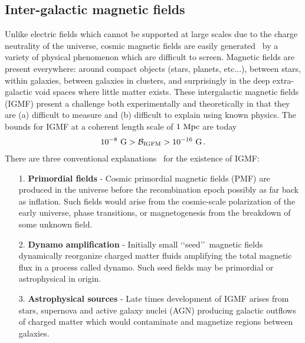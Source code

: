 \documentclass[a4paper]{article}
\begin{document}
\subsection{Inter-galactic magnetic fields}\label{sec:IGMF}
\noindent Unlike electric fields which cannot be supported at large scales due to the charge neutrality of the universe, cosmic magnetic fields are easily generated~\cite{kronberg1994extragalactic,gaensler2004origin,durrer2013cosmological} by a variety of physical phenomenon which are difficult to screen. Magnetic fields are present everywhere: around compact objects (stars, planets, etc...), between stars, within galaxies, between galaxies in clusters, and surprisingly in the deep extra-galactic void spaces where little matter exists. These intergalactic magnetic fields (IGMF) present a challenge both experimentally and theoretically in that they are (a) difficult to measure and (b) difficult to explain using known physics. The bounds for IGMF at a coherent length scale of $1{\rm\ Mpc}$ are today~\cite{neronov2010evidence,taylor2011extragalactic,pshirkov2015new,vernstrom2021discovery}
\begin{align}
    10^{-8}{\rm\ G}>\mathcal{B}_{\rm IGFM}>10^{-16}{\rm\ G}\,.
\end{align}
There are three conventional explanations~\cite{batista2021gammaray} for the existence of IGMF:
\begin{itemize}
    \item [1.] \textbf{Primordial fields} - Cosmic primordial magnetic fields (PMF) are produced in the universe before the recombination epoch possibly as far back as inflation. Such fields would arise from the cosmic-scale polarization of the early universe, phase transitions, or magnetogenesis from the breakdown of some unknown field.
    \item [2.] \textbf{Dynamo amplification} - Initially small \lq\lq seed\rq\rq\ magnetic fields dynamically reorganize charged matter fluids amplifying the total magnetic flux in a process called dynamo. Such seed fields may be primordial or astrophysical in origin.
    \item [3.] \textbf{Astrophysical sources} - Late times development of IGMF arises from stars, supernova and active galaxy nuclei (AGN) producing galactic outflows of charged matter which would contaminate and magnetize regions between galaxies.
\end{itemize}
\end{document}
